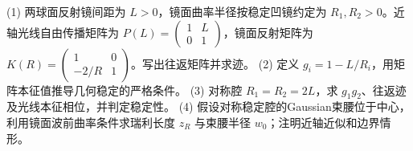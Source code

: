(1) 两球面反射镜间距为 \(L>0\)，镜面曲率半径按稳定凹镜约定为 \(R_1,R_2>0\)。近轴光线自由传播矩阵为 \(P(L)=\left(\begin{smallmatrix}1&L\\0&1\end{smallmatrix}\right)\)，镜面反射矩阵为 \(K(R)=\left(\begin{smallmatrix}1&0\\-2/R&1\end{smallmatrix}\right)\)。写出往返矩阵并求迹。
(2) 定义 \(g_i=1-L/R_i\)，用矩阵本征值推导几何稳定的严格条件。
(3) 对称腔 \(R_1=R_2=2L\)，求 \(g_1g_2\)、往返迹及光线本征相位，并判定稳定性。
(4) 假设对称稳定腔的Gaussian束腰位于中心，利用镜面波前曲率条件求瑞利长度 \(z_R\) 与束腰半径 \(w_0\)；注明近轴近似和边界情形。
